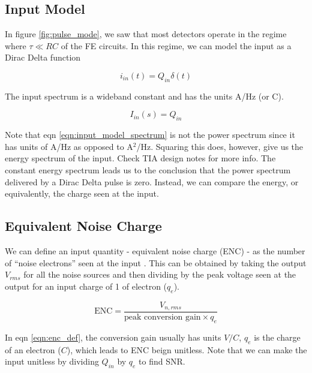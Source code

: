 \documentclass{article}
\begin{document}
\subsection{Input Model}


In figure \ref{fig:pulse_mode}, we saw that most detectors operate in the regime where $\tau \ll RC$ of the FE circuits. In this regime, we can model the input as a Dirac Delta function 


\begin{equation}
    \label{eqn:input_model_td}
    i_{in}(t) = Q_{in}\delta(t)
\end{equation}

The input spectrum is a wideband constant and has the units A/Hz (or C). 

\begin{equation}
    \label{eqn:input_model_spectrum}
    I_{in}(s) = Q_{in}
\end{equation}

Note that eqn \ref{eqn:input_model_spectrum} is not the power spectrum since it has units of A/Hz as opposed to A$^2$/Hz. Squaring this does, however, give us the energy spectrum of the input. Check TIA design notes for more info.
The constant energy spectrum leads us to the conclusion that the power spectrum delivered by a Dirac Delta pulse is zero. Instead, we can compare the energy, or equivalently, the charge seen at the input.


\subsection{Equivalent Noise Charge}

We can define an input quantity - equivalent noise charge (ENC) - as the number of ``noise electrons'' seen at the input \cite{Rivetti2015}. This can be obtained by taking the 
output $V_{rms}$ for all the noise sources and then dividing by the peak voltage seen at the output for an input charge of 1 of electron ($q_e$). 


\begin{equation}
    \label{eqn:enc_def}
    \mathrm{ENC} = \frac{V_{n,rms}}{\text{peak conversion gain}\times q_e}
\end{equation}

In eqn \ref{eqn:enc_def}, the conversion gain usually has units $V/C$, $q_e$ is the charge of an electron ($C$), which leads to ENC beign unitless. 
Note that we can make the input unitless by dividing $Q_{in}$ by $q_e$ to find SNR. 
\end{document}
